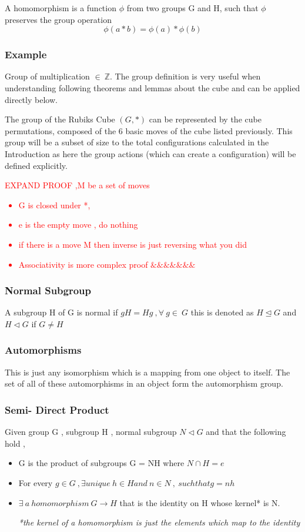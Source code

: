 \documentclass{article}
\begin{document}
A homomorphism is a function $\phi $ from two groups G and H,  such that $\phi$ preserves the group operation 
\begin{equation}
	\phi(a*b)= \phi(a) * \phi(b)
\end{equation}

\subsubsection*{Example}
Group of multiplication $\in \ \mathbb{Z}$.
\newline The group definition is very useful when understanding following theorems and lemmas about the cube and can be applied directly below.

The group of the Rubiks Cube $(G,*)$ can be represented by the cube permutations, composed of the 6 basic moves of the cube listed previously.  This group will be a subset of size to the total configurations calculated in the Introduction as here the group actions (which can create a configuration) will be defined explicitly.

\textcolor{red}{EXPAND PROOF ,M be a set of moves 
\begin{itemize}
\item G is closed under *, 
\item e is the empty move , do nothing
\item if there is a move M then inverse is just reversing what you did
\item Associativity is more complex proof $\&\&\&\&\&\&\&$
\end{itemize}}


\subsubsection*{Normal Subgroup}
A subgroup H of G is normal if $ gH=Hg\ , \forall \ g \in \ G$ this is denoted as $H\trianglelefteq G$ and $H\triangleleft G$ if $G \neq H$

\subsubsection*{Automorphisms}
This is just any isomorphism which is a mapping from one object to itself. The set of all of these automorphisms in an object form the automorphism group.

\subsubsection*{Semi- Direct Product}
Given group G , subgroup H , normal subgroup $N \triangleleft G$ and that the following hold ,
\begin{itemize}
\item G is the product of subgroups G = NH where $N \cap H = {e}$ 
\item For every $g \in G \ , \exists unique \ h \in H and \ n \in N\ ,\ such that g=nh$
\item $\exists \ a \ homomorphism \ G \rightarrow H$ that is the identity on H whose kernel* is N.

\textit{*the kernel of a homomorphism is just the elements which map to the identity}
\end{itemize}
\end{document}
